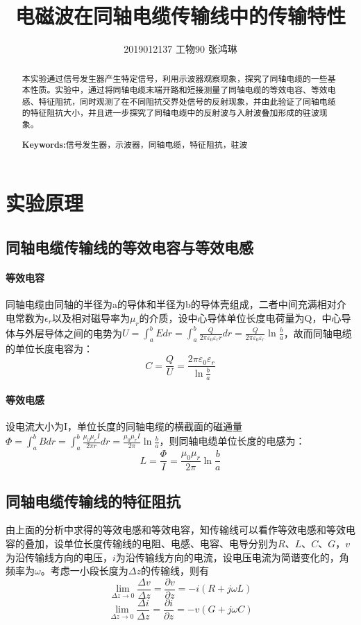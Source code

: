 \documentclass[UTF8]{ctexart}
\begin{document}
\title{电磁波在同轴电缆传输线中的传输特性}
\author{2019012137  工物90  张鸿琳}
\maketitle
\begin{abstract}
本实验通过信号发生器产生特定信号，利用示波器观察现象，探究了同轴电缆的一些基本性质。实验中，通过将同轴电缆末端开路和短接测量了同轴电缆的等效电容、等效电感、特征阻抗，同时观测了在不同阻抗交界处信号的反射现象，并由此验证了同轴电缆的特征阻抗大小，并且进一步探究了同轴电缆中的反射波与入射波叠加形成的驻波现象。

\centering
\textbf{Keywords:}信号发生器，示波器，同轴电缆，特征阻抗，驻波
\end{abstract}

\section{实验原理}
\subsection{同轴电缆传输线的等效电容与等效电感}
\paragraph{等效电容}
同轴电缆由同轴的半径为a的导体和半径为b的导体壳组成，二者中间充满相对介电常数为$\epsilon_r$以及相对磁导率为$\mu_r$的介质，设中心导体单位长度电荷量为Q，中心导体与外层导体之间的电势为$U=\int_{a}^{b}Edr=\int_{a}^{b}\frac{Q}{2\pi\varepsilon_0\varepsilon_rr}dr=\frac{Q}{2\pi\varepsilon_0\varepsilon_r}\ln\frac{b}{a}$，故而同轴电缆的单位长度电容为：
\begin{equation}
C=\frac{Q}{U}=\frac{2\pi\varepsilon_0\varepsilon_r}{\ln\frac{b}{a}}
\end{equation}
\paragraph{等效电感}
设电流大小为I，单位长度的同轴电缆的横截面的磁通量$\Phi=\int_{a}^{b}Bdr=\int_{a}^{b}\frac{\mu_0\mu_rI}{2\pi r}dr=\frac{\mu_0\mu_rI}{2\pi}\ln\frac{b}{a}$，则同轴电缆单位长度的电感为：
\begin{equation}
L=\frac{\Phi}{I}=\frac{\mu_0\mu_r}{2\pi}\ln\frac{b}{a}
\end{equation}
\subsection{同轴电缆传输线的特征阻抗}
由上面的分析中求得的等效电感和等效电容，知传输线可以看作等效电感和等效电容的叠加，设单位长度传输线的电阻、电感、电容、电导分别为$R$、$L$、$C$、$G$，$v$为沿传输线方向的电压，$i$为沿传输线方向的电流，设电压电流为简谐变化的，角频率为$\omega$。考虑一小段长度为$\Delta z$的传输线，则有
\begin{equation}
{\lim_{\Delta z \to 0}}\frac{\Delta v}{\Delta z}=\frac{\partial v}{\partial z}=-i(R+j\omega L)
\end{equation}
\begin{equation}
{\lim_{\Delta z \to 0}}\frac{\Delta i}{\Delta z}=\frac{\partial i}{\partial z}=-v(G+j\omega C)
\end{equation}
\end{document}
